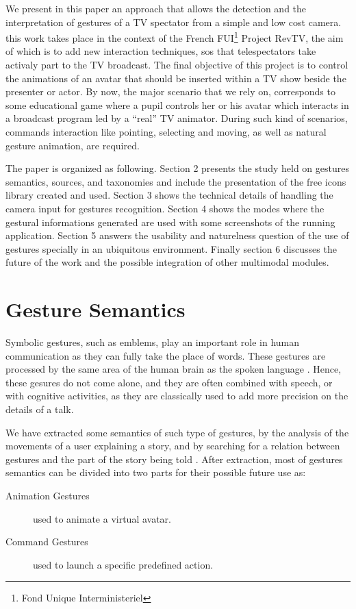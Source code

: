 \documentclass{llncs}
\begin{document}
We present in this paper an approach that allows the detection and the
interpretation of gestures of a TV spectator from a simple and low cost camera. this work takes place in the context of the French FUI\footnote{Fond Unique Interministeriel} Project RevTV,  the aim of which is to add new interaction techniques, sos that telespectators take activaly part to the TV broadcast.
The final objective of this project is to control the animations of an avatar
that should be inserted within a TV show beside the presenter or actor.
By now, the major scenario that we rely on, corresponds to some educational game where a pupil
controls her or his avatar which interacts in a broadcast program led by a ``real'' TV animator.
During such kind of scenarios, commands interaction like pointing, selecting and moving, as well as natural gesture animation, are required.

The paper is organized as following.
Section 2 presents the study held on gestures
semantics, sources, and taxonomies and include the presentation of the free
icons library created and used.
Section 3 shows the technical details of handling the camera input for gestures recognition.
Section 4 shows the modes where the gestural informations generated are used
with some screenshots of the running application.
Section 5 answers the usability and naturelness question of the use of gestures
specially in an ubiquitous environment.
Finally section 6 discusses the future of the work and the possible integration of
other multimodal modules.

\section{Gesture Semantics}
Symbolic gestures, such as emblems, play an important role in human
communication as they can fully take the place of words. These gestures are processed by the same area of the human brain as the spoken language \cite{SymbolicGest}. Hence, these gesures do not come alone, and they are often combined with speech, or with cognitive
activities, as they are classically used to add more precision on the details of a talk.


We have extracted some semantics of such type of gestures, by the analysis of the movements of
a user explaining a story, and by searching for a relation between gestures and the
part of the story being told \cite{gestureThought}. After extraction, most of gestures semantics can be divided into two parts for
their possible future use as:
\begin{description}
 \item[Animation Gestures] used to animate a virtual avatar.
 \item[Command Gestures] used to launch a specific predefined action.
\end{description}
\end{document}
